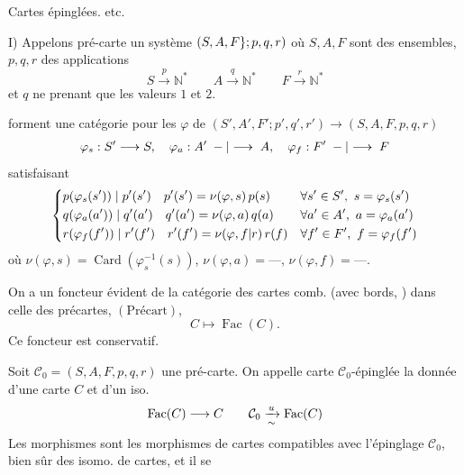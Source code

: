 Cartes  épinglées. etc.

I) Appelons pré-carte un système $(S,A,F\};p,q,r)$ où $S,A,F$ sont des ensembles, $p,q,r$ des applications
\[
S\xrightarrow{p}\mathbb N^{*}\qquad A\xrightarrow{q}\mathbb N^{*}\qquad F\xrightarrow{r}\mathbb N^{*}
\]
et $q$ ne prenant que les valeurs $1$ et $2$.

 forment une catégorie pour les  $\varphi$ de $(S',A',F';p',q',r')\longrightarrow(S,A,F,p,q,r)$
\[
\varphi_s:S'\longrightarrow S,\quad\varphi_a:A'\;-|\longrightarrow\;A,\quad\varphi_f:F'\;-|\longrightarrow\;F
\]
satisfaisant
\[
\left\{\begin{aligned}
&p(\varphi_s(s'))\mid p'(s')\quad p'(s')=\nu(\varphi,s)\,p(s)
&&\forall s'\in S',\ s=\varphi_s(s')\\
&q(\varphi_a(a'))\mid q'(a')\quad q'(a')=\nu(\varphi,a)\,q(a)
&&\forall a'\in A',\ a=\varphi_a(a')\\
&r(\varphi_f(f'))\mid r'(f')\quad r'(f')=\nu(\varphi,f|r)\,r(f)
&&\forall f'\in F',\ f=\varphi_f(f')
\end{aligned}\right.
\]
où $\nu(\varphi,s)=\operatorname{Card}(\varphi_s^{-1}(s))$, $\nu(\varphi,a)=\text{---}$, $\nu(\varphi,f)=\text{---}$.

On a un foncteur évident de la catégorie  des cartes comb. (avec bords,  ) dans celle des précartes, $(\mathrm{Précart})$,
\[
C\longmapsto\operatorname{Fac}(C).
\]
Ce foncteur est conservatif.

Soit $\mathcal C_0=(S,A,F,p,q,r)$ une pré-carte.
On appelle carte  $\mathcal C_0$-épinglée la donnée d'une carte $C$ et d'un iso.
\[
\operatorname{Fac}(C)\longrightarrow C
\qquad\mathcal C_0\xrightarrow[\sim]{u}\operatorname{Fac}(C)
\]
 Les morphismes sont les morphismes de cartes compatibles avec l'épinglage $\mathcal C_0$, bien sûr des isomo. de cartes, et il se
